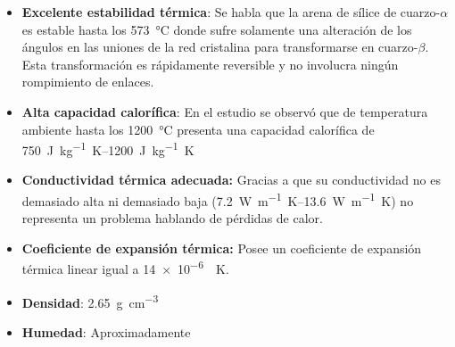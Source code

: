 			\begin{itemize}
				\item \textbf{Excelente estabilidad térmica}: Se habla que la arena de sílice de cuarzo-$\alpha$ es estable hasta los \qty{573}{\degreeCelsius} donde sufre solamente una alteración de los ángulos en las uniones de la red cristalina para transformarse en cuarzo-$\beta$. Esta transformación es rápidamente reversible y no involucra ningún rompimiento de enlaces.
				\item \textbf{Alta capacidad calorífica}: En el estudio se observó que de temperatura ambiente hasta los \qty{1200}{\degreeCelsius} presenta una capacidad calorífica de \qtyrange{750}{1200}{\joule\per\kg\kelvin}
				\item \textbf{Conductividad térmica adecuada:} Gracias a que su conductividad no es demasiado alta ni demasiado baja (\qtyrange{7.2}{13.6}{\watt\per\m\kelvin}) no representa un problema hablando de pérdidas de calor.
				\item \textbf{Coeficiente de expansión térmica:} Posee un coeficiente de expansión térmica linear igual a \qty{14e-6}{\per\kelvin}.
				\item \textbf{Densidad}: \qty{2.65}{\g\per\cm\tothe{3}}
				\item \textbf{Humedad}: Aproximadamente 
			\end{itemize}
			
			
			
			
			